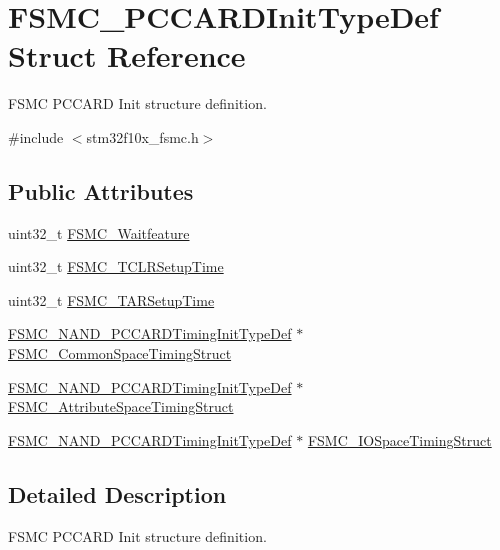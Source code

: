 \hypertarget{structFSMC__PCCARDInitTypeDef}{
\section{FSMC\_\-PCCARDInitTypeDef Struct Reference}
\label{structFSMC__PCCARDInitTypeDef}
}


FSMC PCCARD Init structure definition.  




{\ttfamily \#include $<$stm32f10x\_\-fsmc.h$>$}

\subsection*{Public Attributes}
\begin{DoxyCompactItemize}
\item 
uint32\_\-t \hyperlink{structFSMC__PCCARDInitTypeDef_a3ffd8c627ffe3ac90dfbfe93a8b97c26}{FSMC\_\-Waitfeature}
\item 
uint32\_\-t \hyperlink{structFSMC__PCCARDInitTypeDef_a15db9675791f6f9c7fd82fe1084ff694}{FSMC\_\-TCLRSetupTime}
\item 
uint32\_\-t \hyperlink{structFSMC__PCCARDInitTypeDef_ac83f977e01623595e0aa8dd0b1eb3fcc}{FSMC\_\-TARSetupTime}
\item 
\hyperlink{structFSMC__NAND__PCCARDTimingInitTypeDef}{FSMC\_\-NAND\_\-PCCARDTimingInitTypeDef} $\ast$ \hyperlink{structFSMC__PCCARDInitTypeDef_a87cb99ebe9b5ed570c6467abc9c2ef6d}{FSMC\_\-CommonSpaceTimingStruct}
\item 
\hyperlink{structFSMC__NAND__PCCARDTimingInitTypeDef}{FSMC\_\-NAND\_\-PCCARDTimingInitTypeDef} $\ast$ \hyperlink{structFSMC__PCCARDInitTypeDef_aee510f2e6e6ef18e7f5eedfed702f697}{FSMC\_\-AttributeSpaceTimingStruct}
\item 
\hyperlink{structFSMC__NAND__PCCARDTimingInitTypeDef}{FSMC\_\-NAND\_\-PCCARDTimingInitTypeDef} $\ast$ \hyperlink{structFSMC__PCCARDInitTypeDef_abd9b9e8d7623829a40e5255b0949a3a1}{FSMC\_\-IOSpaceTimingStruct}
\end{DoxyCompactItemize}


\subsection{Detailed Description}
FSMC PCCARD Init structure definition. 

